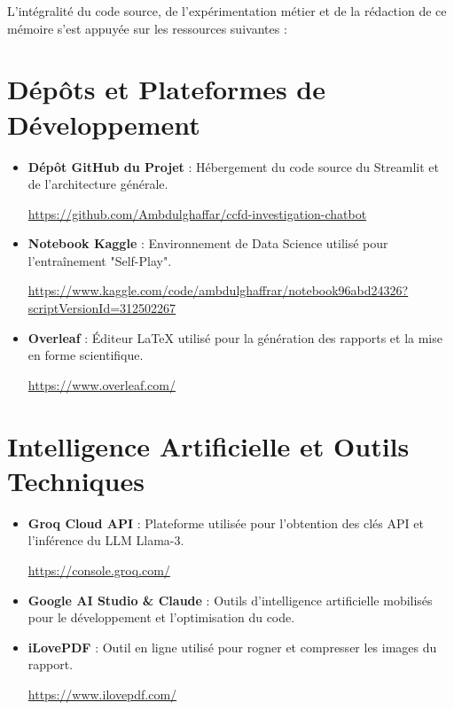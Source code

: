 \documentclass[12pt, a4paper, twoside]{report}
\begin{document}
L'intégralité du code source, de l'expérimentation métier et de la rédaction de ce mémoire s'est appuyée sur les ressources suivantes :

\section*{Dépôts et Plateformes de Développement}
\begin{itemize}\setlength\itemsep{0.5em}
    \item \textbf{Dépôt GitHub du Projet} : Hébergement du code source du Streamlit et de l'architecture générale. \par \url{https://github.com/Ambdulghaffar/ccfd-investigation-chatbot}
    \item \textbf{Notebook Kaggle} : Environnement de Data Science utilisé pour l'entraînement "Self-Play". \par \url{https://www.kaggle.com/code/ambdulghaffrar/notebook96abd24326?scriptVersionId=312502267}
    \item \textbf{Overleaf} : Éditeur LaTeX utilisé pour la génération des rapports et la mise en forme scientifique. \par \url{https://www.overleaf.com/}
\end{itemize}

\section*{Intelligence Artificielle et Outils Techniques}
\begin{itemize}\setlength\itemsep{0.5em}
    \item \textbf{Groq Cloud API} : Plateforme utilisée pour l'obtention des clés API et l'inférence du LLM Llama-3. \par \url{https://console.groq.com/}
    \item \textbf{Google AI Studio \& Claude} : Outils d'intelligence artificielle mobilisés pour le développement et l'optimisation du code.
    \item \textbf{iLovePDF} : Outil en ligne utilisé pour rogner et compresser les images du rapport. \par \url{https://www.ilovepdf.com/}
\end{itemize}
\end{document}
